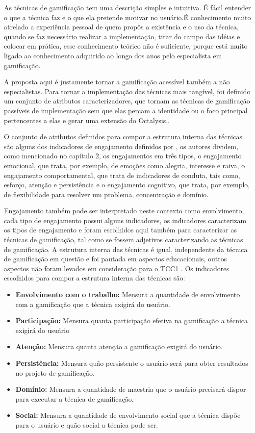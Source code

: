 As técnicas de gamificação tem uma descrição simples e intuitiva. É fácil entender o que a técnica faz e o que ela pretende motivar no usuário.É conhecimento muito atrelado a experiência pessoal de quem propôs a existência e o uso da técnica, quando se faz necessário realizar a implementação, tirar do campo das idéias e colocar em prática, esse conhecimento teórico não é suficiente, porque está muito ligado ao conhecimento adquirido ao longo dos anos pelo especialista em gamificação.

 A proposta aqui é justamente tornar a gamificação acessível também a não especialistas. Para tornar a implementação das técnicas mais tangível, foi definido um conjunto de atributos caracterizadores, que tornam as técnicas de gamificação passíveis de implementação sem que elas percam a identidade ou o foco principal pertencentes a elas e gerar uma extensão do Octalysis..

 O conjunto de atributos definidos para compor a estrutura interna das técnicas são alguns dos indicadores de engajamento definidos por \cite{fredericks2004school}, os autores dividem, como mencionado no capítulo 2, os engajamentos em três tipos, o engajamento emocional, que trata, por exemplo, de emoções como alegria, interesse e raiva, o engajamento comportamental, que trata de indicadores de conduta, tais como, esforço, atenção e persistência e o engajamento cognitivo, que trata, por exemplo, de flexibilidade para resolver um problema, concentração e domínio.

 Engajamento também pode ser interpretado neste contexto como envolvimento, cada tipo de engajamento possui alguns indicadores, os indicadores caracterizam os tipos de engajamento e foram escolhidos aqui também para caracterizar as técnicas de gamificação, tal como se fossem adjetivos caracterizando as técnicas de gamificação. A estrutura interna das técnicas é igual, independente da técnica de gamificação em questão e foi pautada em aspectos educacionais, outros aspectos não foram levados em consideração para o TCC1 . Os indicadores escolhidos para compor a estrutura interna das técnicas são: 


\begin{itemize}
\item  \textbf {Envolvimento com o trabalho:}  Mensura a quantidade de envolvimento com a gamificação que a técnica exigirá do usuário.
\item  \textbf {Participação:}  Mensura quanta participação efetiva na gamificação a técnica exigirá do usuário
\item  \textbf {Atenção:}  Mensura quanta atenção a gamificação exigirá do usuário.
\item  \textbf {Persistência:} Mensura quão persistente o usuário será para obter resultados no projeto de gamificação. 
\item  \textbf {Domínio:} Mensura a quantidade de maestria que o usuário precisará dispor para executar a técnica de gamificação. 
\item  \textbf{Social:} Mensura a quantidade de envolvimento social que a técnica dispõe para o usuário e quão social a técnica pode ser.
\end{itemize}


